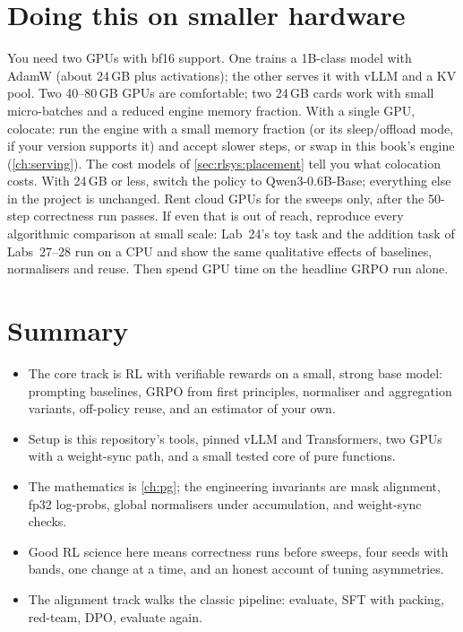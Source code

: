 \section{Doing this on smaller hardware}\label{sec:proj5:outside}

You need two GPUs with bf16 support. One trains a 1B-class model with AdamW (about 24\,GB plus
activations); the other serves it with vLLM and a KV pool. Two 40--80\,GB GPUs are comfortable; two
24\,GB cards work with small micro-batches and a reduced engine memory fraction. With a single GPU,
colocate: run the engine with a small memory fraction (or its sleep/offload mode, if your version
supports it) and accept slower steps, or swap in this book's engine (\cref{ch:serving}). The cost
models of \cref{sec:rlsys:placement} tell you what colocation costs. With 24\,GB or less, switch the policy
to Qwen3-0.6B-Base; everything else in the project is unchanged. Rent cloud GPUs for the sweeps only,
after the 50-step correctness run passes. If even that is out of reach, reproduce every algorithmic
comparison at small scale: Lab~24's toy task and the addition task of Labs~27--28 run on a CPU and show
the same qualitative effects of baselines, normalisers and reuse. Then spend GPU time on the headline
GRPO run alone.

\section{Summary}
\begin{itemize}
\item The core track is RL with verifiable rewards on a small, strong base model: prompting baselines,
  GRPO from first principles, normaliser and aggregation variants, off-policy reuse, and an estimator of
  your own.
\item Setup is this repository's  tools, pinned vLLM and Transformers, two GPUs
  with a weight-sync path, and a small tested core of pure functions.
\item The mathematics is \cref{ch:pg}; the engineering invariants are mask alignment, fp32 log-probs,
  global normalisers under accumulation, and weight-sync checks.
\item Good RL science here means correctness runs before sweeps, four seeds with bands, one change at a
  time, and an honest account of tuning asymmetries.
\item The alignment track walks the classic pipeline: evaluate, SFT with packing, red-team, DPO,
  evaluate again.
\end{itemize}

